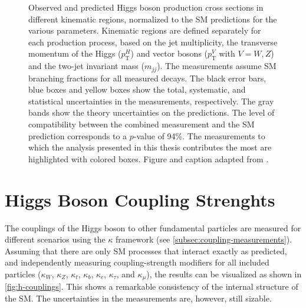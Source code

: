 \begin{figure}
    \caption[Observed and predicted Higgs boson production cross sections in different kinematic regions.]{
      Observed and predicted Higgs boson production cross sections in different
    kinematic regions, normalized to the SM predictions for the various parameters. 
    Kinematic regions are defined separately for each production process, based on the jet multiplicity, the transverse momentum of the Higgs ($p_{\textrm{T}}^H$) and vector bosons ($p_{\textrm{T}}^V$ with $V = W, Z$) and the two-jet invariant mass ($m_{jj}$).
    The measurements assume SM branching fractions for all measured decays. The black error bars, blue boxes and yellow boxes show the total, systematic, and statistical uncertainties in the measurements, respectively. The gray bands show the theory uncertainties on the predictions. The level of compatibility between the combined measurement and the SM prediction corresponds to a $p$-value of 94\%. 
    The measurements to which the \HWW analysis presented in this thesis contributes the most are highlighted with colored boxes. 
    Figure and caption adapted from .
    }
    \label{fig:stxs-stage12}
  \end{figure}

\FloatBarrier

\section{Higgs Boson Coupling Strenghts}
The couplings of the Higgs boson to other fundamental particles are measured for different scenarios using the $\kappa$ framework (see \cref{subsec:coupling-measurements}).
Assuming that there are only SM processes that interact exactly as predicted, and independently measuring coupling-strength modifiers for all included particles ($\kappa_W$, $\kappa_Z$, $\kappa_t$, $\kappa_b$, $\kappa_c$, $\kappa_\tau$, and $\kappa_\mu$), the results can be visualized as shown in \cref{fig:h-couplings}. 
This shows a remarkable consistency of the internal structure of the SM. 
The uncertainties in the measurements are, however, still sizable. 

